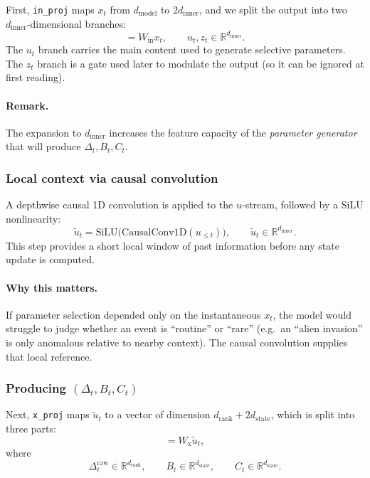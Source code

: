 \documentclass[a4paper,11pt]{article}
\begin{document}
First, \texttt{in\_proj} maps $x_t$ from $d_{\text{model}}$ to $2d_{\text{inner}}$, and we split the output into two $d_{\text{inner}}$-dimensional branches:
\begin{equation}
    [u_t, z_t] = W_{\text{in}} x_t,
    \qquad 
    u_t, z_t \in \mathbb{R}^{d_{\text{inner}}}.
    \label{eq:inproj_split}
\end{equation}
The $u_t$ branch carries the main content used to generate selective parameters. 
The $z_t$ branch is a gate used later to modulate the output (so it can be ignored at first reading).

\paragraph{Remark.}
The expansion to $d_{\text{inner}}$ increases the feature capacity of the \emph{parameter generator} that will produce $\Delta_t, B_t, C_t$.

\subsubsection{Local context via causal convolution}
\label{app:mamba-conv}

A depthwise causal 1D convolution is applied to the $u$-stream, followed by a SiLU nonlinearity:
\begin{equation}
    \tilde{u}_t = \mathrm{SiLU}\!\big(\mathrm{CausalConv1D}(u_{\le t})\big),
    \qquad 
    \tilde{u}_t \in \mathbb{R}^{d_{\text{inner}}}.
    \label{eq:conv_silu}
\end{equation}
This step provides a short local window of past information before any state update is computed.

\paragraph{Why this matters.}
If parameter selection depended only on the instantaneous $x_t$, the model would struggle to judge whether an event is ``routine'' or ``rare'' (e.g.\ an ``alien invasion'' is only anomalous relative to nearby context). 
The causal convolution supplies that local reference.

\subsubsection{Producing $(\Delta_t, B_t, C_t)$}
\label{app:mamba-xproj}

Next, \texttt{x\_proj} maps $\tilde{u}_t$ to a vector of dimension $d_{\text{rank}} + 2d_{\text{state}}$, which is split into three parts:
\begin{equation}
    [\Delta^{\text{raw}}_t,\, B_t,\, C_t] 
    = W_{\text{x}} \tilde{u}_t,
    \label{eq:xproj_split}
\end{equation}
where
\[
\Delta^{\text{raw}}_t \in \mathbb{R}^{d_{\text{rank}}}, 
\qquad
B_t \in \mathbb{R}^{d_{\text{state}}},
\qquad
C_t \in \mathbb{R}^{d_{\text{state}}}.
\]
\end{document}
